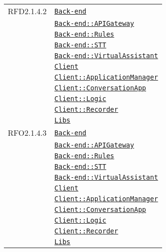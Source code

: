 \begin{longtable}{|>{\centering}m{3cm}|m{10cm}<{\centering}|}
RFD2.1.4.2 & \hyperref[Back-end]{\texttt{Back-end}}\\
& \hyperref[Back-end::APIGateway]{\texttt{Back-end::APIGateway}}\\
& \hyperref[Back-end::Rules]{\texttt{Back-end::Rules}}\\
& \hyperref[Back-end::STT]{\texttt{Back-end::STT}}\\
& \hyperref[Back-end::VirtualAssistant]{\texttt{Back-end::VirtualAssistant}}\\
& \hyperref[Client]{\texttt{Client}}\\
& \hyperref[Client::ApplicationManager]{\texttt{Client::ApplicationManager}}\\
& \hyperref[Client::ConversationApp]{\texttt{Client::ConversationApp}}\\
& \hyperref[Client::Logic]{\texttt{Client::Logic}}\\
& \hyperref[Client::Recorder]{\texttt{Client::Recorder}}\\
& \hyperref[Libs]{\texttt{Libs}}\\ \hline

RFO2.1.4.3 & \hyperref[Back-end]{\texttt{Back-end}}\\
& \hyperref[Back-end::APIGateway]{\texttt{Back-end::APIGateway}}\\
& \hyperref[Back-end::Rules]{\texttt{Back-end::Rules}}\\
& \hyperref[Back-end::STT]{\texttt{Back-end::STT}}\\
& \hyperref[Back-end::VirtualAssistant]{\texttt{Back-end::VirtualAssistant}}\\
& \hyperref[Client]{\texttt{Client}}\\
& \hyperref[Client::ApplicationManager]{\texttt{Client::ApplicationManager}}\\
& \hyperref[Client::ConversationApp]{\texttt{Client::ConversationApp}}\\
& \hyperref[Client::Logic]{\texttt{Client::Logic}}\\
& \hyperref[Client::Recorder]{\texttt{Client::Recorder}}\\
& \hyperref[Libs]{\texttt{Libs}}\\ \hline


\end{longtable}
